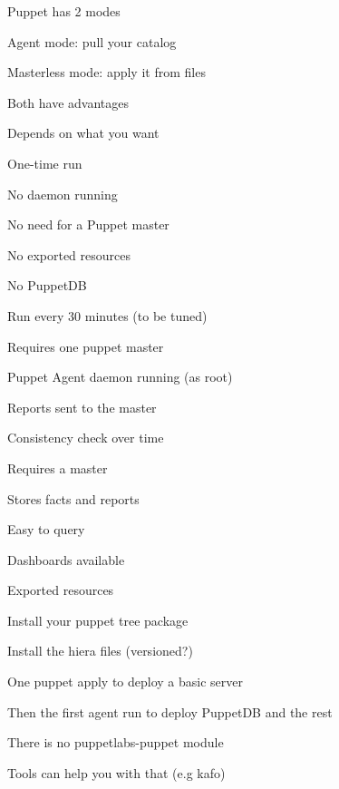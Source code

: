
\begin{iframe}
\item Puppet has 2 modes
\item Agent mode: pull your catalog
\item Masterless mode: apply it from files
\item Both have advantages
\item Depends on what you want
\end{iframe}

\begin{iframe}
\item One-time run
\item No daemon running
\item No need for a Puppet master
\item No exported resources
\item No PuppetDB
\end{iframe}
\begin{iframe}
\item Run every 30 minutes (to be tuned)
\item Requires one puppet master
\item Puppet Agent daemon running (as root)
\item Reports sent to the master
\item Consistency check over time
\end{iframe}

\begin{iframe}[PuppetDB]
\item Requires a master
\item Stores facts and reports
\item Easy to query
\item Dashboards available
\item Exported resources
\end{iframe}

\begin{iframe}
\item Install your puppet tree package
\item Install the hiera files (versioned?)
\item One puppet apply to deploy a basic server
\item Then the first agent run to deploy PuppetDB and the rest
\item There is no puppetlabs-puppet module
\item Tools can help you with that (e.g kafo)
\end{iframe}


